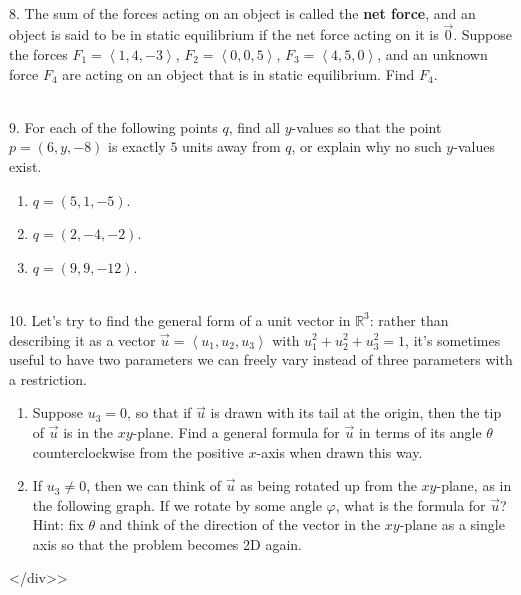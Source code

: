\documentclass{article}
\begin{document}
~\\

8. The sum of the forces acting on an object is called the \textbf{net force}, and an object is said to be in static equilibrium if the net force acting on it is $\vec{0}$. Suppose the forces $F_1 = \left< 1, 4, -3 \right>$, $F_2 = \left< 0, 0, 5 \right>$, $F_3 = \left< 4, 5, 0 \right>$, and an unknown force $F_4$ are acting on an object that is in static equilibrium. Find $F_4$.

~\\

9. For each of the following points $q$, find all $y$-values so that the point $p = (6, y, -8)$ is exactly $5$ units away from $q$, or explain why no such $y$-values exist.

\begin{enumerate}

	\item $q = (5, 1, -5)$.

	\item $q = (2, -4, -2)$.

	\item $q = (9, 9, -12)$.

\end{enumerate}

~\\

10. Let's try to find the general form of a unit vector in $\mathbb{R}^3$: rather than describing it as a vector $\vec{u} = \left< u_1, u_2, u_3 \right>$ with $u_1^2 + u_2^2 + u_3^2 = 1$, it's sometimes useful to have two parameters we can freely vary instead of three parameters with a restriction.

\begin{enumerate}

	\item Suppose $u_3 = 0$, so that if $\vec{u}$ is drawn with its tail at the origin, then the tip of $\vec{u}$ is in the $xy$-plane. Find a general formula for $\vec{u}$ in terms of its angle $\theta$ counterclockwise from the positive $x$-axis when drawn this way.

	\item If $u_3 \neq 0$, then we can think of $\vec{u}$ as being rotated up from the $xy$-plane, as in the following graph. If we rotate by some angle $\varphi$, what is the formula for $\vec{u}$? Hint: fix $\theta$ and think of the direction of the vector in the $xy$-plane as a single axis so that the problem becomes 2D again.

\end{enumerate}

</div>>
\end{document}
